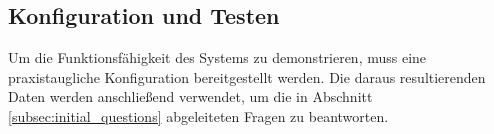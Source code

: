 \subsection{Konfiguration und Testen}
Um die Funktionsfähigkeit des Systems zu demonstrieren, muss eine praxistaugliche Konfiguration bereitgestellt werden. Die daraus resultierenden Daten werden anschließend verwendet, um die in Abschnitt \ref{subsec:initial_questions} abgeleiteten Fragen zu beantworten.


